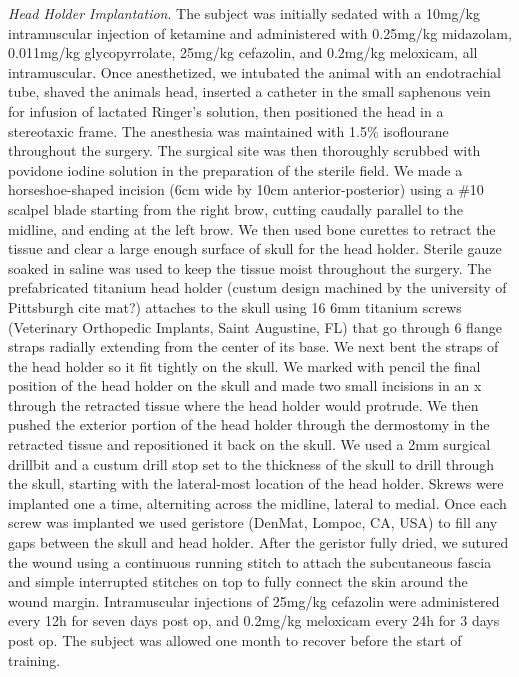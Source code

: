 \textit{Head Holder Implantation}. The subject was initially sedated with a 10mg/kg intramuscular injection of ketamine and administered with 0.25mg/kg midazolam, 0.011mg/kg glycopyrrolate, 25mg/kg cefazolin, and 0.2mg/kg meloxicam, all intramuscular. Once anesthetized, we intubated the animal with an endotrachial tube, shaved the animals head, inserted a catheter in the small saphenous vein for infusion of lactated Ringer's solution, then positioned the head in a stereotaxic frame. The anesthesia was maintained with 1.5\% isoflourane throughout the surgery. The surgical site was then thoroughly scrubbed with povidone iodine solution in the preparation of the sterile field. We made a horseshoe-shaped incision (6cm wide by 10cm anterior-posterior) using a \#10 scalpel blade starting from the right brow, cutting caudally parallel to the midline, and ending at the left brow. We then used bone curettes to retract the tissue and clear a large enough surface of skull for the head holder. Sterile gauze soaked in saline was used to keep the tissue moist throughout the surgery. The prefabricated titanium head holder (custum design machined by the university of Pittsburgh cite mat?) attaches to the skull using 16 6mm titanium screws (Veterinary Orthopedic Implants, Saint Augustine, FL) that go through 6 flange straps radially extending from the center of its base. We next bent the straps of the head holder so it fit tightly on the skull. We marked with pencil the final position of the head holder on the skull and made two small incisions in an x through the retracted tissue where the head holder would protrude. We then pushed the exterior portion of the head holder through the dermostomy in the retracted tissue and repositioned it back on the skull. We used a 2mm surgical drillbit and a custum drill stop set to the thickness of the skull to drill through the skull, starting with the lateral-most location of the head holder. Skrews were implanted one a time, alterniting across the midline, lateral to medial. Once each screw was implanted we used geristore (DenMat, Lompoc, CA, USA) to fill any gaps between the skull and head holder. After the geristor fully dried, we sutured the wound using a continuous running stitch to attach the subcutaneous fascia and simple interrupted stitches on top to fully connect the skin around the wound margin. Intramuscular injections of 25mg/kg cefazolin were administered every 12h for seven days post op, and 0.2mg/kg meloxicam every 24h for 3 days post op. The subject was allowed one month to recover before the start of training.


